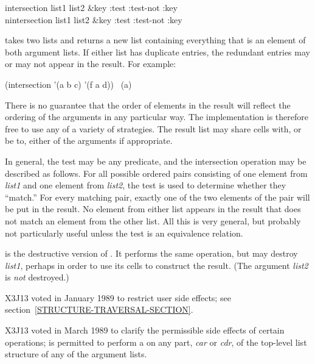 \begin{defun}[Function]
intersection list1 list2 &key :test :test-not :key \\
nintersection list1 list2 &key :test :test-not :key

 takes two lists and returns a new list containing
everything that is an element of both argument lists.
If either list has duplicate entries, the redundant entries
may or may not appear in the result.
For example:
\begin{lisp}
(intersection '(a b c) '(f a d)) \EV\ (a)
\end{lisp}
There is no guarantee that the order of elements in the result will
reflect the ordering of the arguments in any particular way.
The implementation is therefore free to use any of a variety of strategies.
The result list may share cells with, or be  to, either of the arguments
if appropriate.

In general, the test may be any predicate, and the intersection operation
may be described as follows.  For all possible ordered pairs consisting of
one element from {\it list1} and one element from {\it list2}, the test is
used to determine whether they ``match.''  For every matching pair,
exactly one of the two elements of the pair will be put in the result.
No element from either list appears in the result that does not match
an element from the other list.
All this is very general, but probably
not particularly useful unless the test is an equivalence relation.

 is the destructive version of .
It performs the same operation, but may destroy {\it list1},
perhaps in order to use its cells to construct the result.
(The argument {\it list2} is {\it not} destroyed.)

\begin{new}
X3J13 voted in January 1989
to restrict user side effects; see section~\ref{STRUCTURE-TRAVERSAL-SECTION}.
\end{new}

\begin{newer}
X3J13 voted in March 1989 
to clarify the permissible side effects of certain operations;
 is permitted to perform a  on any part,
{\it car} or {\it cdr}, of the top-level list structure of 
any of the argument lists.
\end{newer}
\end{defun}

